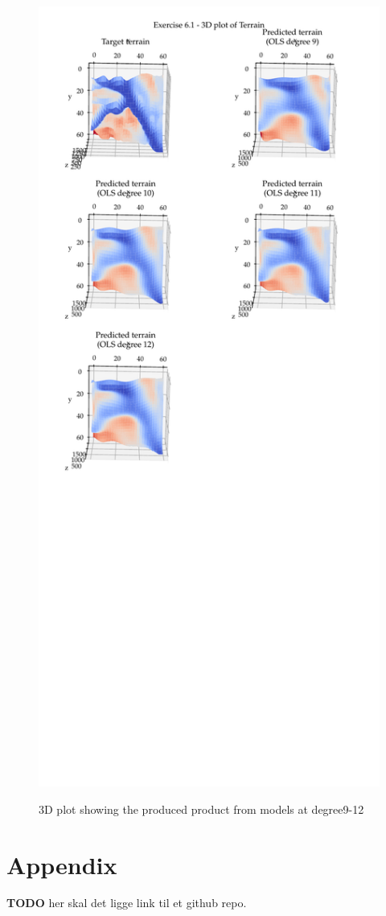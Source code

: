 \documentclass[11pt, a4paper]{article}
\begin{document}
\begin{figure}
  \centering
  \caption{3D plot showing the produced product from models at degree9-12}
  \hspace*{-1.2cm}
  \includegraphics[scale=0.95]{figures/EX6_EX1_target_terrain_and_OLS_prediction_3D.pdf}
  \label{fig:EX6_1_OLS_3D}
\end{figure}


\section*{Appendix\label{sec:A}}
\textbf{TODO} her skal det ligge link til et github repo.

\newpage
\newpage



\end{document}
